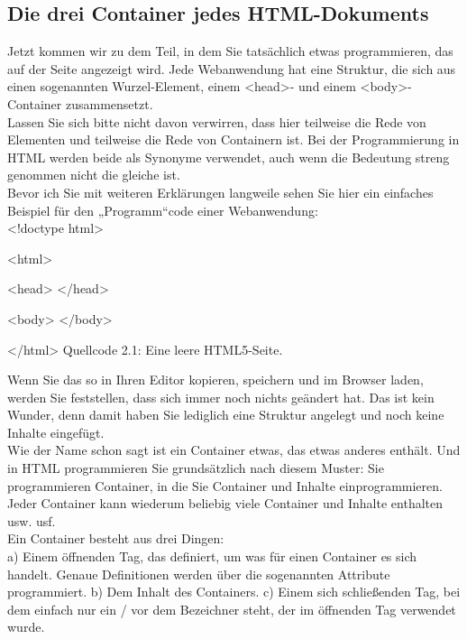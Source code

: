 \subsection{Die drei Container jedes HTML-Dokuments}

Jetzt kommen wir zu dem Teil, in dem Sie tatsächlich etwas programmieren, das auf der Seite angezeigt wird. Jede Webanwendung hat eine Struktur, die sich aus einen sogenannten Wurzel-Element, einem <head>- und einem <body>-Container zusammensetzt.\\

Lassen Sie sich bitte nicht davon verwirren, dass hier teilweise die Rede von Elementen und teilweise die Rede von Containern ist. Bei der Programmierung in HTML werden beide als Synonyme verwendet, auch wenn die Bedeutung streng genommen nicht die gleiche ist.\\

Bevor ich Sie mit weiteren Erklärungen langweile sehen Sie hier ein einfaches Beispiel für den „Programm“code einer Webanwendung: \\

<!doctype html> 

<html> 

<head> 
</head> 

<body> 
</body> 

</html>
Quellcode 2.1: Eine leere HTML5-Seite.

Wenn Sie das so in Ihren Editor kopieren, speichern und im Browser laden, werden Sie feststellen, dass sich immer noch nichts geändert hat. Das ist kein Wunder, denn damit haben Sie lediglich eine Struktur angelegt und noch keine Inhalte eingefügt.\\

Wie der Name schon sagt ist ein Container etwas, das etwas anderes enthält. Und in HTML programmieren Sie grundsätzlich nach diesem Muster: Sie programmieren Container, in die Sie Container und Inhalte einprogrammieren. Jeder Container kann wiederum beliebig viele Container und Inhalte enthalten usw. usf.\\

Ein Container besteht aus drei Dingen:\\

a)	Einem öffnenden Tag, das definiert, um was für einen Container es sich handelt. Genaue Definitionen werden über die sogenannten Attribute programmiert.
b)	Dem Inhalt des Containers.
c)	Einem sich schließenden Tag, bei dem einfach nur ein / vor dem Bezeichner steht, der im öffnenden Tag verwendet wurde. 

